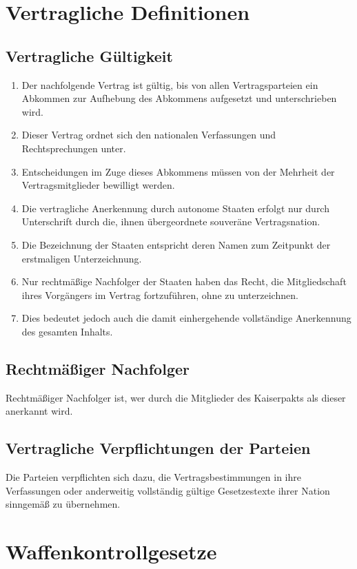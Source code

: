 \documentclass{article}
\begin{document}
\section{Vertragliche Definitionen}

\subsection{Vertragliche Gültigkeit}
\begin{enumerate}[(1)]
    \item Der nachfolgende Vertrag ist gültig, bis von allen Vertragsparteien ein Abkommen zur Aufhebung des Abkommens aufgesetzt und unterschrieben wird.
    \item Dieser Vertrag ordnet sich den nationalen Verfassungen und Rechtsprechungen unter.
    \item Entscheidungen im Zuge dieses Abkommens müssen von der Mehrheit der Vertragsmitglieder bewilligt werden.
    \item Die vertragliche Anerkennung durch autonome Staaten erfolgt nur durch Unterschrift durch die, ihnen übergeordnete souveräne Vertragsnation.
    \item Die Bezeichnung der Staaten entspricht deren Namen zum Zeitpunkt der erstmaligen Unterzeichnung.
    \item Nur rechtmäßige Nachfolger der Staaten haben das Recht, die Mitgliedschaft ihres Vorgängers im Vertrag fortzuführen, ohne zu unterzeichnen.
    \item Dies bedeutet jedoch auch die damit einhergehende vollständige Anerkennung des gesamten Inhalts.
\end{enumerate}

\subsection{Rechtmäßiger Nachfolger}
Rechtmäßiger Nachfolger ist, wer durch die Mitglieder des Kaiserpakts als dieser anerkannt wird.

\subsection{Vertragliche Verpflichtungen der Parteien}
Die Parteien verpflichten sich dazu, die Vertragsbestimmungen in ihre Verfassungen oder anderweitig vollständig gültige Gesetzestexte ihrer Nation sinngemäß zu übernehmen.

\section{Waffenkontrollgesetze}
\end{document}
